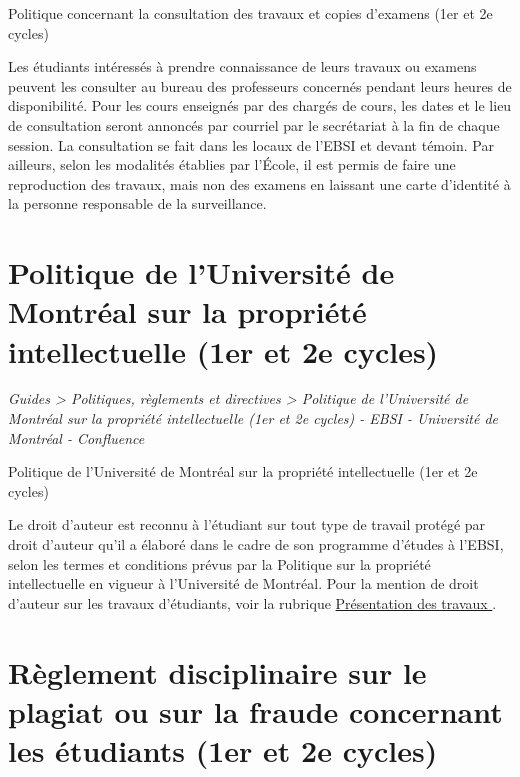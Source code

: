\documentclass [12 pt]{article}
\begin{document}
        Politique concernant la consultation des travaux et copies d'examens (1er et 2e
            cycles)
        
            Les étudiants intéressés à prendre connaissance de leurs travaux ou examens peuvent
                les consulter au bureau des professeurs concernés pendant leurs heures de
                disponibilité. Pour les cours enseignés par des chargés de cours, les dates et le
                lieu de consultation seront annoncés par courriel par le secrétariat à la fin de
                chaque session. La consultation se fait dans les locaux de l'EBSI et devant témoin.
                Par ailleurs, selon les modalités établies par l'École, il est permis de faire une
                reproduction des travaux, mais non des examens en laissant une carte d'identité à la
                personne responsable de la surveillance.
        
    
    
        \newpage
        \section {
        Politique de l'Université de Montréal sur la propriété intellectuelle (1er et 2e
            cycles)
        }
        
        
        
        \textit{
        Guides > Politiques, règlements et directives > Politique de l'Université
            de Montréal sur la propriété intellectuelle (1er et 2e cycles) - EBSI - Université de
            Montréal - Confluence
        }
    
        Politique de l'Université de Montréal sur la propriété intellectuelle (1er et 2e
            cycles)
        
            Le droit d'auteur est reconnu à l'étudiant sur tout type de travail protégé par droit
                d'auteur qu'il a élaboré dans le cadre de son programme d'études à l'EBSI, selon les
                termes et conditions prévus par la Politique sur la propriété intellectuelle en
                vigueur à l'Université de Montréal. Pour la mention de droit d'auteur sur les
                travaux d'étudiants, voir la rubrique 
        \href{
        /pages/viewpage.action?pageId=124097350
        } {
        Présentation des travaux
        }
    .
        
    
    
        \newpage
        \section {
        Règlement disciplinaire sur le plagiat ou sur la fraude concernant les étudiants (1er
            et 2e cycles)
        }
        
\end{document}
